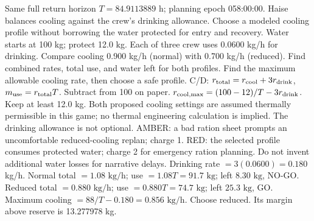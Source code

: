 {Same full return horizon \(T=84.9113889\) h; planning epoch 058:00:00.}
{Haise balances cooling against the crew's drinking allowance.
Choose a modeled cooling profile without borrowing the water
protected for entry and recovery.}
{Water starts at 100 kg; protect 12.0 kg.
Each of three crew uses 0.0600 kg/h for drinking.
Compare cooling 0.900 kg/h (normal) with 0.700 kg/h (reduced).
Find combined rates, total use, and water left for both profiles.
Find the maximum allowable cooling rate, then choose a safe profile.}
{C/D: \(r_{\rm total}=r_{\rm cool}+3r_{\rm drink}\),
\(m_{\rm use}=r_{\rm total}T\).
Subtract from 100 on paper.
\(r_{\rm cool,max}=(100-12)/T-3r_{\rm drink}\).}
{Keep at least 12.0 kg. Both proposed cooling settings are assumed
thermally permissible in this game; no thermal engineering calculation
is implied. The drinking allowance is not optional.}
{AMBER: a bad ration sheet prompts an uncomfortable reduced-cooling
replan; charge 1. RED: the selected profile consumes protected water;
charge 2 for emergency ration planning. Do not invent additional
water losses for narrative delays.}
{Drinking rate \(=3(0.0600)=0.180\) kg/h.
Normal total \(=\boxed{1.08\text{ kg/h}}\);
use \(=1.08T=\boxed{91.7\text{ kg}}\);
left \(\boxed{8.30\text{ kg}}\), NO-GO.
Reduced total \(=\boxed{0.880\text{ kg/h}}\);
use \(=0.880T=\boxed{74.7\text{ kg}}\);
left \(\boxed{25.3\text{ kg}}\), GO.
Maximum cooling \(=88/T-0.180
=\boxed{0.856\text{ kg/h}}\).
Choose \(\boxed{\text{reduced}}\).
Its margin above reserve is 13.277978 kg.}

